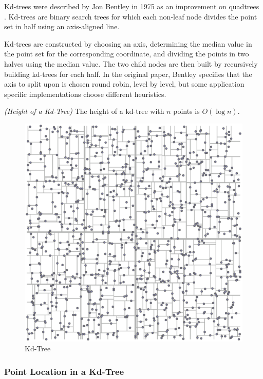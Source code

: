 \documentclass[mcs]{scsthesis}
\begin{document}
Kd-trees were described by Jon Bentley in 1975 as an improvement on quadtrees
\cite{kdtree}.  Kd-trees are binary search trees for which each non-leaf node
divides the point set in half using an axis-aligned line.

Kd-trees are constructed by choosing an axis, determining the median value in
the point set for the corresponding coordinate, and dividing the points in two
halves using the median value. The two child nodes are then built by
recursively building kd-trees for each half. In the original paper, Bentley
specifies that the axis to split upon is chosen round robin, level by level,
but some application specific implementations choose different heuristics.

\begin{thm} \emph{(Height of a Kd-Tree)}
The height of a kd-tree with $n$ points is \(O(\log n)\).
\end{thm}

\begin{figure}
\begin{center}
\includegraphics[scale=0.35]{diagrams/kdtree.eps}
\caption{Kd-Tree}
\end{center}
\end{figure}

\subsubsection{Point Location in a Kd-Tree}
\end{document}
